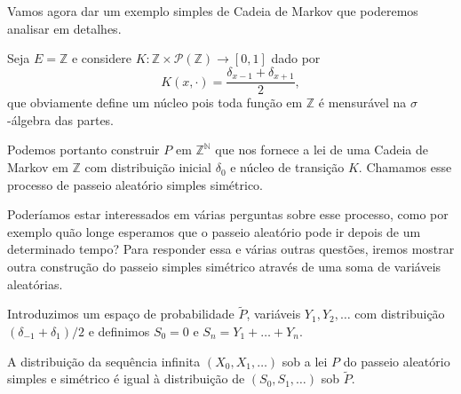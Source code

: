 Vamos agora dar um exemplo simples de Cadeia de Markov que poderemos analisar em detalhes.

Seja $E = \mathbb{Z}$ e considere $K: \mathbb{Z} \times \mathcal{P}(\mathbb{Z}) \to [0,1]$ dado por
\begin{equation}
  K(x, \cdot) = \frac{\delta_{x-1} + \delta_{x+1}}{2},
\end{equation}
que obviamente define um núcleo pois toda função em $\mathbb{Z}$ é mensurável na $\sigma$-álgebra das partes.

Podemos portanto construir $P$ em $\mathbb{Z}^{\mathbb{N}}$ que nos fornece a lei de uma Cadeia de Markov em $\mathbb{Z}$ com distribuição inicial $\delta_0$ e núcleo de transição $K$.
Chamamos esse processo de passeio aleatório simples simétrico. 

Poderíamos estar interessados em várias perguntas sobre esse processo, como por exemplo quão longe esperamos que o passeio aleatório pode ir depois de um determinado tempo?
Para responder essa e várias outras questões, iremos mostrar outra construção do passeio simples simétrico através de uma soma de variáveis aleatórias.

Introduzimos um espaço de probabilidade $\tilde P$, variáveis $Y_1, Y_2, \dots$ \iid com distribuição $(\delta_{-1} + \delta_{1})/2$ e definimos $S_0 = 0$ e $S_n = Y_1 + \dots + Y_n$.

\begin{lemma}
  A distribuição da sequência infinita $(X_0, X_1, \dots)$ sob a lei $P$ do passeio aleatório simples e simétrico é igual à distribuição de $(S_0, S_1, \dots)$ sob $\tilde P$.
\end{lemma}

